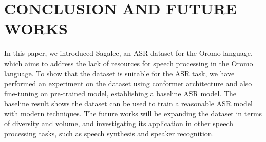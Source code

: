\documentclass[conference, 9pt]{IEEEtran}
\begin{document}
\begin{table}[htb]
    \centering
    \caption{Experiment result on Sagalee dataset}
    \label{tab:result}
\end{table}

\section{CONCLUSION AND FUTURE WORKS}
\label{sec:conclusion}
In this paper, we introduced Sagalee, an ASR dataset for the Oromo language, which aims to address the lack of resources for speech processing in the Oromo language. To show that the dataset is suitable for the ASR task, we have performed an experiment on the dataset using conformer architecture and also fine-tuning on pre-trained model, establishing a baseline ASR model. 
The baseline result shows the dataset can be used to train a reasonable ASR model with modern techniques. 
The future works will be expanding the dataset in terms of diversity and volume, and investigating its application in other speech processing tasks, such as speech synthesis and speaker recognition. 

\vfill\pagebreak
% 
% 

\end{document}
